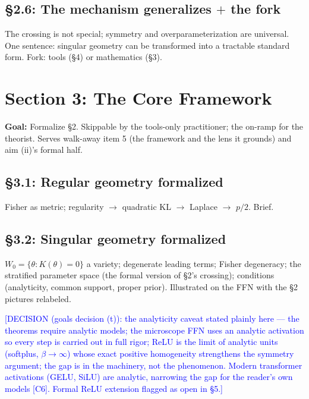 \documentclass[11pt]{article}
\newcommand{\tagg}[1]{\textcolor{blue}{[#1]}}
\begin{document}
\subsection*{\S2.6: The mechanism generalizes $+$ the fork}

The crossing is not special; symmetry and overparameterization are
universal. One sentence: singular geometry can be transformed into a
tractable standard form. Fork: tools (\S4) or mathematics (\S3).

\section{Section 3: The Core Framework}

\textbf{Goal:} Formalize \S2. Skippable by the tools-only practitioner;
the on-ramp for the theorist. Serves walk-away item 5 (the framework and
the lens it grounds) and aim (ii)'s formal half.

\subsection*{\S3.1: Regular geometry formalized}

Fisher as metric; regularity $\to$ quadratic KL $\to$ Laplace $\to$
$p/2$. Brief.

\subsection*{\S3.2: Singular geometry formalized}

$W_0=\{\theta: K(\theta)=0\}$ a variety; degenerate leading terms;
Fisher degeneracy; the stratified parameter space (the formal version of
\S2's crossing); conditions (analyticity, common support, proper prior).
Illustrated on the FFN with the \S2 pictures relabeled.

\tagg{DECISION (goals decision (t)): the analyticity caveat stated
plainly here --- the theorems require analytic models; the microscope
FFN uses an analytic activation so every step is carried out in full
rigor; ReLU is the limit of analytic units (softplus,
$\beta\to\infty$) whose exact positive homogeneity strengthens the
symmetry argument; the gap is in the machinery, not the phenomenon.
Modern transformer activations (GELU, SiLU) are analytic, narrowing the
gap for the reader's own models [C6]. Formal ReLU extension flagged as
open in \S5.}
\end{document}
